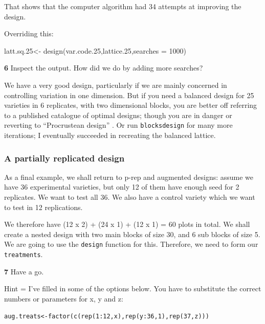 \documentclass[
]{book}
\makeatletter
\newenvironment{Shaded}{\begin{snugshade}}{\end{snugshade}}
\newcommand{\AttributeTok}[1]{\textcolor[rgb]{0.77,0.63,0.00}{#1}}
\newcommand{\DecValTok}[1]{\textcolor[rgb]{0.00,0.00,0.81}{#1}}
\newcommand{\FloatTok}[1]{\textcolor[rgb]{0.00,0.00,0.81}{#1}}
\newcommand{\FunctionTok}[1]{\textcolor[rgb]{0.00,0.00,0.00}{#1}}
\newcommand{\NormalTok}[1]{#1}
\newcommand{\OtherTok}[1]{\textcolor[rgb]{0.56,0.35,0.01}{#1}}
\newenvironment{kframe}{%
\medskip{}
\setlength{\fboxsep}{.8em}
 \def\at@end@of@kframe{}%
 \ifinner\ifhmode%
  \def\at@end@of@kframe{\end{minipage}}%
  \begin{minipage}{\columnwidth}%
 \fi\fi%
 \def\FrameCommand##1{\hskip\@totalleftmargin \hskip-\fboxsep
 \colorbox{shadecolor}{##1}\hskip-\fboxsep
     \hskip-\linewidth \hskip-\@totalleftmargin \hskip\columnwidth}%
 \MakeFramed {\advance\hsize-\width
   \@totalleftmargin\z@ \linewidth\hsize
   \@setminipage}}%
 {\par\unskip\endMakeFramed%
 \at@end@of@kframe}
\newenvironment{rmdblock}[1]
  {
  \begin{itemize}
  \renewcommand{\labelitemi}{
    \raisebox{-.7\height}[0pt][0pt]{
      {\setkeys{Gin}{width=3em,keepaspectratio}\texttt{[image: images/\#1]}}
    }
  }
  \setlength{\fboxsep}{1em}
  \begin{kframe}
  \item
  }
  {
  \end{kframe}
  \end{itemize}
  }
\newenvironment{rmdquiz}
  {\begin{rmdblock}{quiz}}
  {\end{rmdblock}}
\makeatother
\begin{document}
That shows that the computer algorithm had 34 attempts at improving the design.

Overriding this:

\begin{Shaded}
\begin{Highlighting}[]
\NormalTok{latt.sq}\FloatTok{.25}\OtherTok{\textless{}{-}} \FunctionTok{design}\NormalTok{(var.code}\FloatTok{.25}\NormalTok{,lattice}\FloatTok{.25}\NormalTok{,}\AttributeTok{searches =} \DecValTok{1000}\NormalTok{)}
\end{Highlighting}
\end{Shaded}

\begin{rmdquiz}
\textbf{6} Inspect the output. How did we do by adding more searches?
\end{rmdquiz}

We have a very good design, particularly if we are mainly concerned in controlling variation in one dimension. But if you need a balanced design for 25 varieties in 6 replicates, with two dimensional blocks, you are better off referring to a published catalogue of optimal designs; though you are in danger or reverting to ``Procrustean design'' \citep{mead_design_1994}. Or run \texttt{blocksdesign} for many more iterations; I eventually succeeded in recreating the balanced lattice.

\hypertarget{a-partially-replicated-design}{%
\subsubsection{A partially replicated design}\label{a-partially-replicated-design}}

As a final example, we shall return to p-rep and augmented designs: assume we have 36 experimental varieties, but only 12 of them have enough seed for 2 replicates. We want to test all 36. We also have a control variety which we want to test in 12 replications.

We therefore have (12 x 2) + (24 x 1) + (12 x 1) = 60 plots in total. We shall create a nested design with two main blocks of size 30, and 6 sub blocks of size 5.
We are going to use the \texttt{design} function for this. Therefore, we need to form our \texttt{treatments}.

\begin{rmdquiz}
\textbf{7} Have a go.

Hint = I've filled in some of the options below. You have to substitute the correct numbers or parameters for x, y and z:

\texttt{aug.treats\textless{}-factor(c(rep(1:12,x),rep(y:36,1),rep(37,z)))}
\end{rmdquiz}
\end{document}
